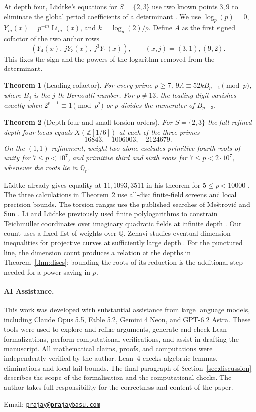 \documentclass[11pt]{article}
\newtheorem{theorem}{Theorem}[section]
\DeclareMathOperator{\Li}{Li}
\begin{document}
At depth four, L\"udtke's equations for \(S=\{2,3\}\) use two known
points \(3,9\) to eliminate the global period coefficients of a
determinant \cite[Theorem~3.8]{Ludtke}. We use \(\log_p(p)=0\),
\(Y_m(x)=p^{-m}\Li_m(x)\), and \(k=\log_p(2)/p\). Define \(A\) as the
first signed cofactor of the two anchor rows
\[
 (Y_4(x),\,jY_3(x),\,j^3Y_1(x)),\qquad (x,j)=(3,1),(9,2).
\]
This fixes the sign and the powers of the logarithm removed from the
determinant.
\begin{theorem}[Leading cofactor]\label{thm:cofactor}
For every prime \(p\ge7\),
\(9A\equiv52kB_{p-3}\pmod p\), where \(B_j\) is the \(j\)-th Bernoulli
number. For \(p\ne13\), the leading digit vanishes exactly when
\(2^{p-1}\equiv1\pmod{p^2}\) or \(p\) divides the numerator of \(B_{p-3}\).
\end{theorem}

\begin{theorem}[Depth four and small torsion orders]\label{thm:cert}
For \(S=\{2,3\}\) the full refined depth-four locus equals
\(X(\mathbb Z[1/6])\) at each of the three primes
\[
 16843,\quad1006003,\quad2124679.
\]
On the \((1,1)\) refinement, weight two alone excludes primitive fourth
roots of unity for \(7\le p<10^7\), and primitive third and sixth roots for
\(7\le p<2\cdot10^7\), whenever the roots lie in \(\mathbb Q_p\).
\end{theorem}

L\"udtke already gives equality at $11,1093,3511$ in his
theorem for \(5\le p<10000\) \cite[Theorem~1.2]{Ludtke}.
The three calculations in Theorem~\ref{thm:cert} use all-disc finite-field screens and
local precision bounds. The torsion ranges use the published searches of
Me\v{s}trovi\'c and Sun \cite{Mestrovic,Sun}.
Li and L\"udtke previously used finite polylogarithms to constrain
Teichm\"uller coordinates over imaginary quadratic fields at infinite
depth \cite[Theorem~8.26]{LL}. Our count uses a fixed list of weights over
\(\mathbb Q\). Zehavi studies eventual dimension inequalities for
projective curves at sufficiently large depth \cite{Zehavi}.
For the punctured line, the dimension count produces a relation at the
depths in Theorem~\ref{thm:discs}; bounding the roots of its reduction
is the additional step needed for a power saving in \(p\).






\paragraph{AI Assistance.}
This work was developed with substantial assistance from large language models,
including Claude Opus 5.5, Fable 5.2, Gemini 4 Neon, and GPT-6.2 Astra.
These tools were used to explore and refine arguments, generate and check Lean
formalizations, perform computational verifications, and assist in drafting the
manuscript. All mathematical claims, proofs, and computations were independently
verified by the author. Lean~4 checks algebraic lemmas, eliminations and
local tail bounds. The final paragraph of Section~\ref{sec:discussion} describes
the scope of the formalisation and the computational checks. The author takes full
responsibility for the correctness and content of the paper.




\noindent Email: \href{mailto:prajay@prajaybasu.com}{\texttt{prajay@prajaybasu.com}}
\end{document}
